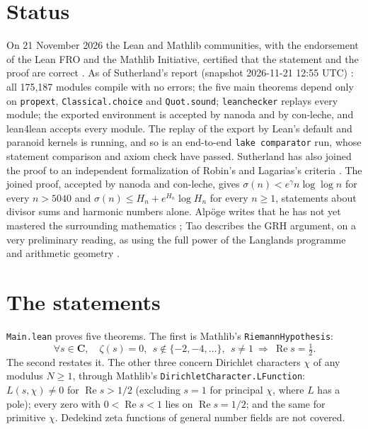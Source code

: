 \documentclass[11pt]{article}
\newcommand{\Lean}[1]{\texttt{\small #1}}
\renewcommand{\Re}{\operatorname{Re}}
\begin{document}
\section{Status}
On 21 November 2026 the Lean and Mathlib communities, with the endorsement of the Lean FRO and the Mathlib Initiative, certified that the statement and the proof are correct \cite{leanfro}. As of Sutherland's report (snapshot 2026-11-21 12:55 UTC) \cite{sutherland}: all 175{,}187 modules compile with no errors; the five main theorems depend only on \Lean{propext}, \Lean{Classical.choice} and \Lean{Quot.sound}; \Lean{leanchecker} replays every module; the exported environment is accepted by nanoda and by con-leche, and lean4lean accepts every module. The replay of the export by Lean's default and paranoid kernels is running, and so is an end-to-end \Lean{lake comparator} run, whose statement comparison and axiom check have passed. Sutherland has also joined the proof to an independent formalization of Robin's and Lagarias's criteria \cite{robin1984}. The joined proof, accepted by nanoda and con-leche, gives $\sigma(n) < e^{\gamma} n \log\log n$ for every $n > 5040$ and $\sigma(n) \le H_n + e^{H_n}\log H_n$ for every $n \ge 1$, statements about divisor sums and harmonic numbers alone. Alp\"oge writes that he has not yet mastered the surrounding mathematics \cite{alpoge}; Tao describes the GRH argument, on a very preliminary reading, as using the full power of the Langlands programme and arithmetic geometry \cite{tao}.

\section{The statements}
\Lean{Main.lean} proves five theorems. The first is Mathlib's \Lean{RiemannHypothesis}:
\[
\forall s\in\mathbf C,\quad \zeta(s)=0,\ \ s\notin\{-2,-4,\dots\},\ \ s\neq 1\ \Longrightarrow\ \Re s=\tfrac12 .
\]
The second restates it. The other three concern Dirichlet characters $\chi$ of any modulus $N\ge1$, through Mathlib's \Lean{DirichletCharacter.LFunction}: $L(s,\chi)\ne0$ for $\Re s>1/2$ (excluding $s=1$ for principal $\chi$, where $L$ has a pole); every zero with $0<\Re s<1$ lies on $\Re s=1/2$; and the same for primitive $\chi$. Dedekind zeta functions of general number fields are not covered.
\end{document}
